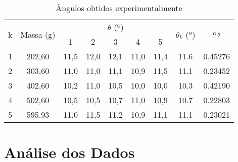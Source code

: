 \documentclass[12pt]{article}
\numberwithin{equation}{section} %
\begin{document}
\begin{table}[H]
\centering
\begin{tabular}{|c|c|ccccc|c|c|}
\hline
\multirow{2}{*}{k} & \multirow{2}{*}{Massa (g)} & \multicolumn{5}{c|}{$\theta$ (º)}                                                                                    & \multirow{2}{*}{$\overline{\theta}_{k}$  (º)} & \multirow{2}{*}{$\sigma_{\theta}$} \\ \cline{3-7}
                   &                            & \multicolumn{1}{c|}{1}    & \multicolumn{1}{c|}{2}    & \multicolumn{1}{c|}{3}    & \multicolumn{1}{c|}{4}    & 5    &                                      &                                    \\ \hline
1                  & 202,60                     & \multicolumn{1}{c|}{11,5} & \multicolumn{1}{c|}{12,0} & \multicolumn{1}{c|}{12,1} & \multicolumn{1}{c|}{11,0} & 11,4 & 11.6                                 & 0.45276                            \\ \hline
2                  & 303,60                     & \multicolumn{1}{c|}{11,0} & \multicolumn{1}{c|}{11,0} & \multicolumn{1}{c|}{11,1} & \multicolumn{1}{c|}{10,9} & 11,5 & 11.1                                 & 0.23452                            \\ \hline
3                  & 402,60                     & \multicolumn{1}{c|}{10,2} & \multicolumn{1}{c|}{11,0} & \multicolumn{1}{c|}{10,5} & \multicolumn{1}{c|}{10,0} & 10,0 & 10.3                                 & 0.42190                            \\ \hline
4                  & 502,60                     & \multicolumn{1}{c|}{10,5} & \multicolumn{1}{c|}{10,5} & \multicolumn{1}{c|}{10,7} & \multicolumn{1}{c|}{11,0} & 10,9 & 10.7                                 & 0.22803                            \\ \hline
5                  & 595.93                     & \multicolumn{1}{c|}{11,0} & \multicolumn{1}{c|}{11,5} & \multicolumn{1}{c|}{11,2} & \multicolumn{1}{c|}{10,9} & 11,1 & 11.1                                 & 0.23021                            \\ \hline
\end{tabular}
\caption{Ângulos obtidos experimentalmente}
\label{table1}
\end{table}

\section{Análise dos Dados}\label{sec:figs}
\end{document}
